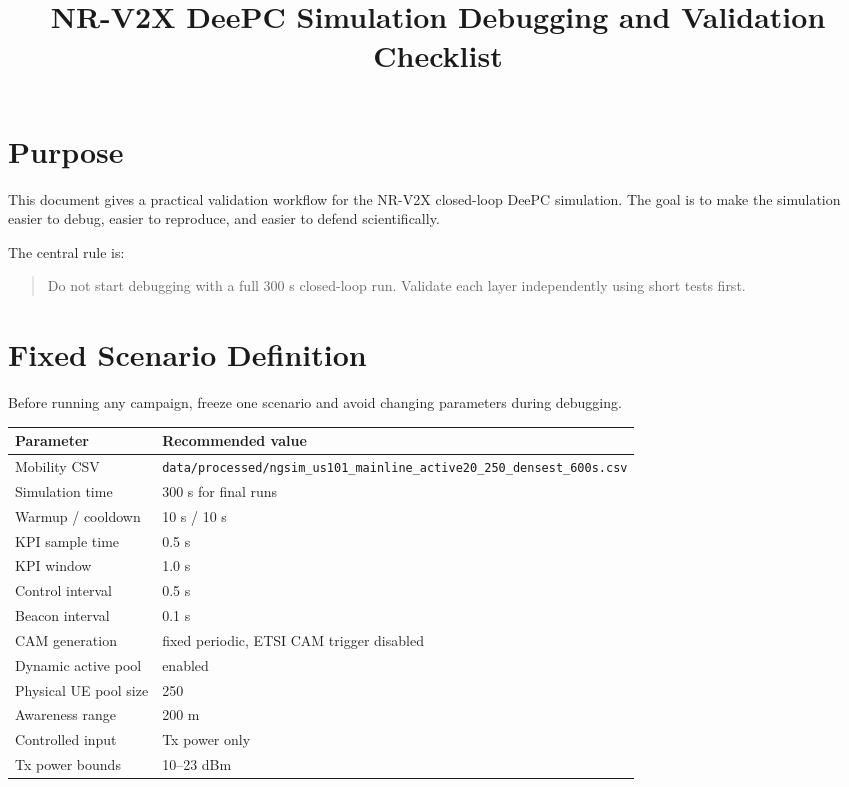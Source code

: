 \documentclass[11pt]{article}
\title{NR-V2X DeePC Simulation Debugging and Validation Checklist}
\author{}
\date{}
\begin{document}
\maketitle

\section{Purpose}

This document gives a practical validation workflow for the NR-V2X closed-loop DeePC simulation. The goal is to make the simulation easier to debug, easier to reproduce, and easier to defend scientifically.

The central rule is:

\begin{quote}
Do not start debugging with a full 300 s closed-loop run. Validate each layer independently using short tests first.
\end{quote}

\section{Fixed Scenario Definition}

Before running any campaign, freeze one scenario and avoid changing parameters during debugging.

\begin{table}[h]
\centering
\begin{tabular}{ll}
\toprule
Parameter & Recommended value \\
\midrule
Mobility CSV & \texttt{data/processed/ngsim\_us101\_mainline\_active20\_250\_densest\_600s.csv} \\
Simulation time & 300 s for final runs \\
Warmup / cooldown & 10 s / 10 s \\
KPI sample time & 0.5 s \\
KPI window & 1.0 s \\
Control interval & 0.5 s \\
Beacon interval & 0.1 s \\
CAM generation & fixed periodic, ETSI CAM trigger disabled \\
Dynamic active pool & enabled \\
Physical UE pool size & 250 \\
Awareness range & 200 m \\
Controlled input & Tx power only \\
Tx power bounds & 10--23 dBm \\
\bottomrule
\end{tabular}
\end{table}
\end{document}
